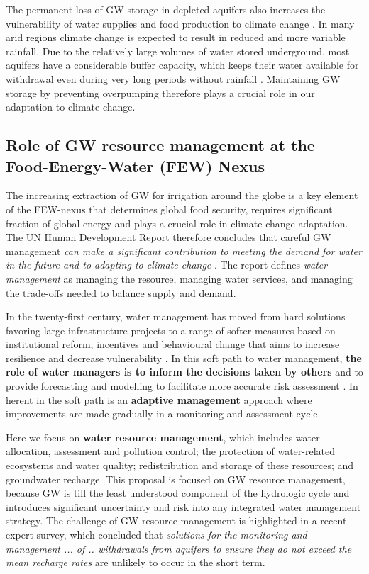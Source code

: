 \documentclass[11pt,final]{article}%
\begin{document}
The permanent loss of GW storage in depleted aquifers also increases the vulnerability of water supplies and food production to climate change \cite{Taylor2013}. In many arid regions climate change is expected to result in reduced and more variable rainfall. Due to the relatively large volumes of water stored underground, most aquifers have a considerable buffer capacity, which keeps their water available for withdrawal even during very long periods without rainfall  \cite{UNESCO2012}. Maintaining GW storage by preventing overpumping therefore plays a crucial role in our adaptation to climate change.

\subsection{Role of GW resource management at the Food-Energy-Water (FEW) Nexus}
The increasing extraction of GW for irrigation around the globe is a key element of the FEW-nexus that determines global food security, requires significant fraction of global energy and plays a crucial role in climate change adaptation.  The UN Human Development Report therefore concludes that careful GW management \emph{can make a significant contribution to meeting the demand for water in the future and to adapting to climate change} \cite{UNESCO2012}. The report defines \emph{water management} as managing the resource, managing water services, and managing the trade-offs needed to balance supply and demand. 

In the twenty-first century, water management has moved from hard solutions favoring large infrastructure projects to a range of softer measures based on institutional reform, incentives and behavioural change that aims to increase resilience and decrease vulnerability \cite{Wolff2002,Brooks2011}. In this soft path to water management, \textbf{the role of water managers is to inform the decisions taken by others} and to provide forecasting and modelling to facilitate more accurate risk assessment \cite{UNESCO2012}. In herent in the soft path is  an \textbf{adaptive management} approach where improvements are made gradually in a monitoring and assessment cycle.

Here we focus on \textbf{water resource management}, which includes water allocation, assessment and pollution control; the protection of water-related ecosystems and water quality; redistribution and storage of these resources; and groundwater recharge. This proposal is focused on GW resource management, because GW is till the least understood component of the hydrologic cycle \cite{Re2015} and introduces significant uncertainty and risk into any integrated water management strategy. The challenge of GW resource management is highlighted in a recent expert survey, which concluded that \emph{solutions for the monitoring and management ... of .. withdrawals from aquifers to ensure they do not exceed the mean recharge rates} are unlikely to occur in the short term. 
\end{document}
